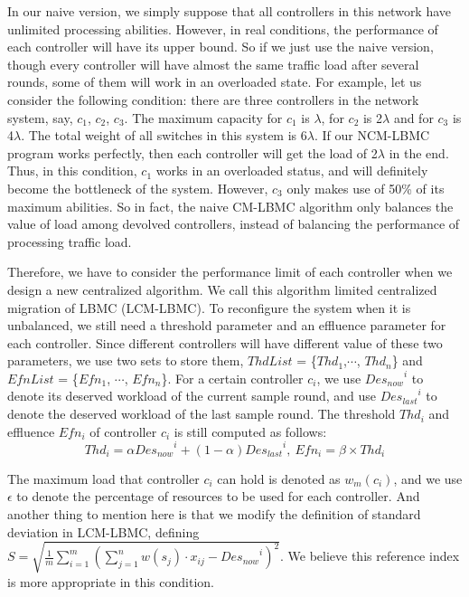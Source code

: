 In our naive version, we simply suppose that all controllers in this network have unlimited processing abilities. However, in real conditions, the performance of each controller will have its upper bound. So if we just use the naive version, though every controller will have almost the same traffic load after several rounds, some of them will work in an overloaded state. For example, let us consider the following condition: there are three controllers in the network system, say, $c_1$, $c_2$, $c_3$. The maximum capacity for $c_1$ is $\lambda$, for $c_2$ is 2$\lambda$ and for $c_3$ is 4$\lambda$. The total weight of all switches in this system is 6$\lambda$. If our NCM-LBMC program works perfectly, then each controller will get the load of 2$\lambda$ in the end. Thus, in this condition, $c_1$ works in an overloaded status, and will definitely become the bottleneck of the system. However, $c_3$ only makes use of 50\% of its maximum abilities. So in fact, the naive CM-LBMC algorithm only balances the value of load among devolved controllers, instead of balancing the performance of processing traffic load.

Therefore, we have to consider the performance limit of each controller when we design a new centralized algorithm. We call this algorithm limited centralized migration of LBMC (LCM-LBMC). To reconfigure the system when it is unbalanced, we still need a threshold parameter and an effluence parameter for each controller. Since different controllers will have different value of these two parameters, we use two sets to store them, $ThdList$ = \{$Thd_1$,$\cdots$, $Thd_n$\} and $EfnList$ = \{$Efn_1$, $\cdots$, $Efn_n$\}. For a certain controller $c_i$, we use ${Des_{now}}^{i}$ to denote its deserved workload of the current sample round, and use ${Des_{last}}^{i}$ to denote the deserved workload of the last sample round. The threshold $Thd_i$ and effluence $Efn_i$ of controller $c_i$ is still computed as follows:
\[Thd_i=\alpha{Des_{now}}^{i} + (1-\alpha){Des_{last}}^{i},~ Efn_i=\beta \times Thd_i\]

The maximum load that controller $c_i$ can hold is denoted as $w_m(c_i)$, and we use $\epsilon$ to denote the percentage of resources to be used for each controller. And another thing to mention here is that we modify the definition of standard deviation in LCM-LBMC, defining $S = \sqrt{\frac{1}{m}\sum_{i=1}^{m} \left(\sum_{j=1}^n w(s_j)\cdot x_{ij}-{Des_{now}}^{i}\right)^2}$. We believe this reference index is more appropriate in this condition.

